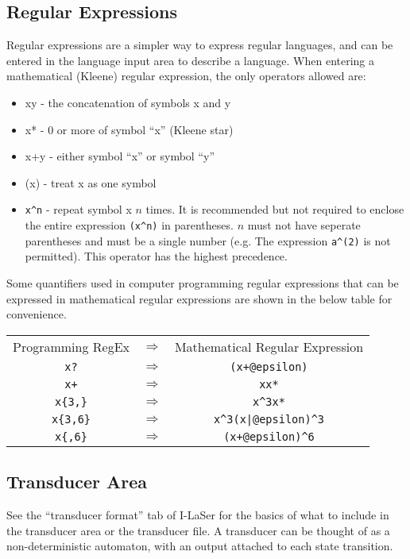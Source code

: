 \documentclass{article}
\begin{document}
\subsection{Regular Expressions}
Regular expressions are a simpler way to express regular languages, and can be entered in the language input area to describe a language.
When entering a mathematical (Kleene) regular expression, the only operators allowed are:
\begin{itemize}
\item xy - the concatenation of symbols x and y
\item x* - 0 or more of symbol ``x'' (Kleene star)
\item x+y - either symbol ``x'' or symbol ``y''
\item (x) - treat x as one symbol
\item \verb-x^n- - repeat symbol x $n$ times. It is recommended but not required to enclose the entire expression \verb-(x^n)- in parentheses. $n$ must not have seperate parentheses and must be a single number (e.g. The expression \verb-a^(2)- is not permitted). This operator has the highest precedence.
\end{itemize}


\par Some quantifiers used in computer programming regular expressions that can be expressed in mathematical regular expressions are shown in the below table for convenience.
\begin{center}
\begin{tabular}{c c c}
Programming RegEx & $\Rightarrow$ & Mathematical Regular Expression \\
\verb-x?- & $\Rightarrow$ & \verb-(x+@epsilon)-\\
\verb-x+- & $\Rightarrow$ & \verb-xx*- \\
\verb-x{3,}- & $\Rightarrow$ & \verb-x^3x*- \\
\verb-x{3,6}- & $\Rightarrow$ & \verb-x^3(x|@epsilon)^3- \\
\verb-x{,6}- & $\Rightarrow$ & \verb-(x+@epsilon)^6- \\
\end{tabular}
\end{center}



\subsection{Transducer Area}
See the ``transducer format'' tab of I-LaSer for the basics of what to include in the transducer area or the transducer file.
A transducer can be thought of as a non-deterministic automaton, with an output attached to each state transition.
\end{document}
